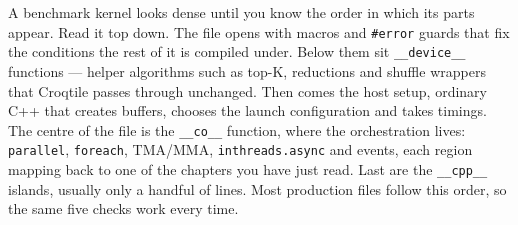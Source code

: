 A benchmark kernel looks dense until you know the order in which its parts appear. Read it top down. The file opens with macros and \texttt{\#error} guards that fix the conditions the rest of it is compiled under. Below them sit \texttt{\_\_device\_\_} functions --- helper algorithms such as top-K, reductions and shuffle wrappers that Croqtile passes through unchanged. Then comes the host setup, ordinary C++ that creates buffers, chooses the launch configuration and takes timings. The centre of the file is the \texttt{\_\_co\_\_} function, where the orchestration lives: \texttt{parallel}, \texttt{foreach}, TMA/MMA, \texttt{inthreads.async} and events, each region mapping back to one of the chapters you have just read. Last are the \texttt{\_\_cpp\_\_} islands, usually only a handful of lines. Most production files follow this order, so the same five checks work every time.
